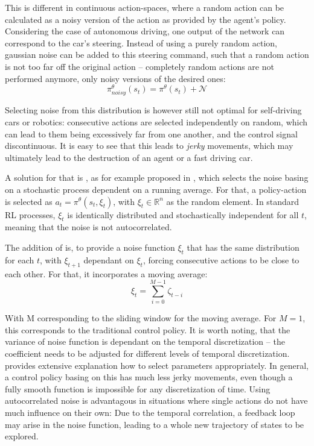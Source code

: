 This is different in continuous action-spaces, where a random action can be calculated as a noisy version of the action as provided by the agent's policy. Considering the case of autonomous driving, one output of the network can correspond to the car's steering. Instead of using a purely random action, gaussian noise can be added to this steering command, such that a random action is not too far off the original action -- completely random actions are not performed anymore, only noisy versions of the desired ones:
\begin{equation*}
	\pi^\theta_{noisy}(s_t) = \pi^\theta(s_t) + \mathcal{N}
\end{equation*}

Selecting noise from this distribution is however still not optimal for self-driving cars or robotics: consecutive actions are selected independently on random, which can lead to them being excessively far from one another, and the control signal discontinuous. It is easy to see that this leads to \textit{jerky} movements, which may ultimately lead to the destruction of an agent or a fast driving car. 

A solution for that is , as for example proposed in \cite{wawrzynski_control_2015}, which selects the noise basing on a stochastic process dependent on a running average. For that, a policy-action is selected as $a_t = \pi^\theta(s_t, \xi_t)$, with $\xi_t \in \mathds{R}^n$ as the random element. In standard RL processes, $\xi_t$ is identically distributed and stochastically independent for all $t$, meaning that the noise is not autocorrelated.

The addition of \cite{wawrzynski_control_2015} is, to provide a noise function $\xi_t$ that has the same distribution for each $t$, with $\xi_{t+1}$ dependant on $\xi_t$, forcing consecutive actions to be close to each other. For that, it incorporates a moving average:\\
\begin{equation*}
	\xi_t = \sum^{M-1}_{i=0} \zeta_{t-i}
\end{equation*}

With M corresponding to the sliding window for the moving average. For $M=1$, this corresponds to the traditional control policy. It is worth noting, that the variance of noise function is dependant on the temporal discretization -- the coefficient needs to be adjusted for different levels of temporal discretization. \cite{wawrzynski_control_2015} provides extensive explanation how to select parameters appropriately. In general, a control policy basing on this has much less jerky movements, even though a fully smooth function is impossible for any discretization of time. Using autocorrelated noise is advantagous in situations where single actions do not have much influence on their own: Due to the temporal correlation, a feedback loop may arise in the noise function, leading to a whole new trajectory of states to be explored.

